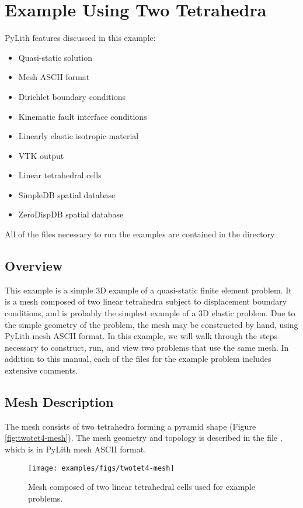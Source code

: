 \section{Example Using Two Tetrahedra}
\label{sec:example:twotet4}

PyLith features discussed in this example:
\begin{itemize}
\item Quasi-static solution
\item Mesh ASCII format
\item Dirichlet boundary conditions
\item Kinematic fault interface conditions
\item Linearly elastic isotropic material
\item VTK output
\item Linear tetrahedral cells
\item SimpleDB spatial database
\item ZeroDispDB spatial database
\end{itemize}
All of the files necessary to run the examples are contained in the
directory 


\subsection{Overview}

This example is a simple 3D example of a quasi-static finite element
problem. It is a mesh composed of two linear tetrahedra subject to
displacement boundary conditions, and is probably the simplest example
of a 3D elastic problem. Due to the simple geometry of the problem,
the mesh may be constructed by hand, using PyLith mesh ASCII format.
In this example, we will walk through the steps necessary to
construct, run, and view two problems that use the same mesh. In
addition to this manual, each of the files for the example problem
includes extensive comments.


\subsection{Mesh Description}

The mesh consists of two tetrahedra forming a pyramid shape (Figure
\vref{fig:twotet4-mesh}). The mesh geometry and topology is described
in the file , which is in PyLith mesh ASCII
format.

\begin{figure}
  \texttt{[image: examples/figs/twotet4-mesh]}
  \caption{Mesh composed of two linear tetrahedral cells used for example problems.}
  \label{fig:twotet4-mesh}
\end{figure}


